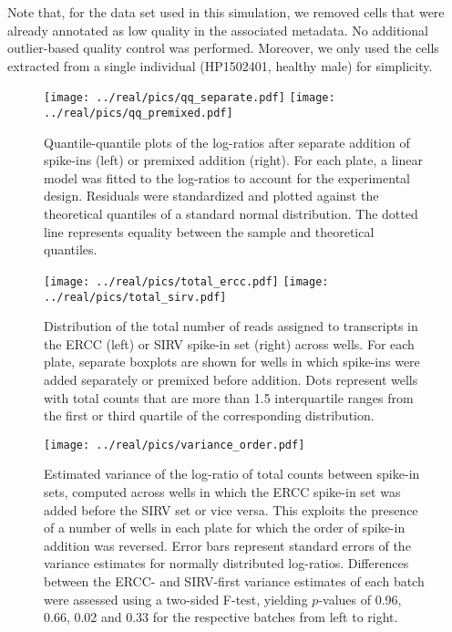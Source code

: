\documentclass{article}
\begin{document}
Note that, for the data set used in this simulation, we removed cells that were already annotated as low quality in the associated metadata.
No additional outlier-based quality control was performed.
Moreover, we only used the cells extracted from a single individual (HP1502401, healthy male) for simplicity.




\newpage
\begin{figure}[btp]
    \begin{center}
        \texttt{[image: ../real/pics/qq\_separate.pdf]}
        \texttt{[image: ../real/pics/qq\_premixed.pdf]}
    \end{center}
    \caption{Quantile-quantile plots of the log-ratios after separate addition of spike-ins (left) or premixed addition (right).
        For each plate, a linear model was fitted to the log-ratios to account for the experimental design.
        Residuals were standardized and plotted against the theoretical quantiles of a standard normal distribution.
        The dotted line represents equality between the sample and theoretical quantiles.
    }
\end{figure}

\begin{figure}[btp]
    \begin{center}
        \texttt{[image: ../real/pics/total\_ercc.pdf]}
        \texttt{[image: ../real/pics/total\_sirv.pdf]}
    \end{center}
    \caption{Distribution of the total number of reads assigned to transcripts in the ERCC (left) or SIRV spike-in set (right) across wells.
        For each plate, separate boxplots are shown for wells in which spike-ins were added separately or premixed before addition.
        Dots represent wells with total counts that are more than 1.5 interquartile ranges from the first or third quartile of the corresponding distribution.
    }
    \label{fig:totals}
\end{figure}

\begin{figure}[btp]
    \begin{center}
        \texttt{[image: ../real/pics/variance\_order.pdf]}
    \end{center}
    \caption{Estimated variance of the log-ratio of total counts between spike-in sets, computed across wells in which the ERCC spike-in set was added before the SIRV set or vice versa.
        This exploits the presence of a number of wells in each plate for which the order of spike-in addition was reversed.
        Error bars represent standard errors of the variance estimates for normally distributed log-ratios.
        Differences between the ERCC- and SIRV-first variance estimates of each batch were assessed using a two-sided F-test, yielding $p$-values of 0.96, 0.66, 0.02 and 0.33 for the respective batches from left to right.
    }
\end{figure}
\end{document}
